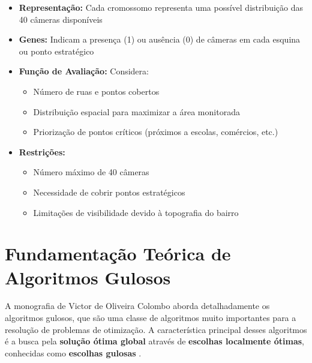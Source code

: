 \documentclass[12pt, a4paper]{report}
\begin{document}
\begin{itemize}
    \item \textbf{Representação:} Cada cromossomo representa uma possível distribuição das 40 câmeras disponíveis
    \item \textbf{Genes:} Indicam a presença (1) ou ausência (0) de câmeras em cada esquina ou ponto estratégico
    \item \textbf{Função de Avaliação:} Considera:
    \begin{itemize}
        \item Número de ruas e pontos cobertos
        \item Distribuição espacial para maximizar a área monitorada
        \item Priorização de pontos críticos (próximos a escolas, comércios, etc.)
    \end{itemize}
    \item \textbf{Restrições:} 
    \begin{itemize}
        \item Número máximo de 40 câmeras
        \item Necessidade de cobrir pontos estratégicos
        \item Limitações de visibilidade devido à topografia do bairro
    \end{itemize}
\end{itemize}

\section{Fundamentação Teórica de Algoritmos Gulosos}

A monografia de Victor de Oliveira Colombo \cite{Colombo2018} aborda detalhadamente os algoritmos gulosos, que são uma classe de algoritmos muito importantes para a resolução de problemas de otimização. A característica principal desses algoritmos é a busca pela \textbf{solução ótima global} através de \textbf{escolhas localmente ótimas}, conhecidas como \textbf{escolhas gulosas} \cite{Colombo2018}.
\end{document}
